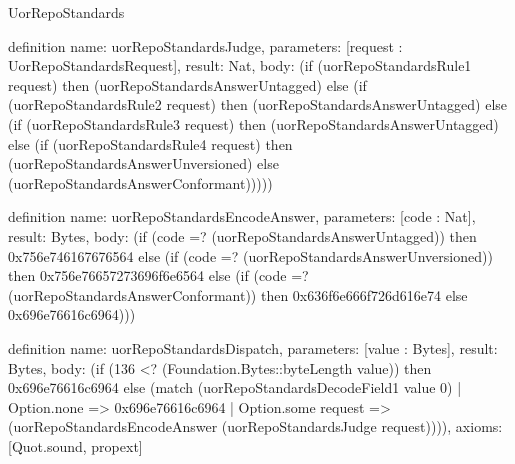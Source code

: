 \begin{lexlean}{UorRepoStandards}
\begin{semanticmodule}
definition{
  name: uorRepoStandardsJudge,
  parameters: [request : UorRepoStandardsRequest],
  result: Nat,
  body: (if (uorRepoStandardsRule1 request) then (uorRepoStandardsAnswerUntagged) else (if (uorRepoStandardsRule2 request) then (uorRepoStandardsAnswerUntagged) else (if (uorRepoStandardsRule3 request) then (uorRepoStandardsAnswerUntagged) else (if (uorRepoStandardsRule4 request) then (uorRepoStandardsAnswerUnversioned) else (uorRepoStandardsAnswerConformant)))))
}

definition{
  name: uorRepoStandardsEncodeAnswer,
  parameters: [code : Nat],
  result: Bytes,
  body: (if (code =? (uorRepoStandardsAnswerUntagged)) then 0x756e746167676564 else (if (code =? (uorRepoStandardsAnswerUnversioned)) then 0x756e76657273696f6e6564 else (if (code =? (uorRepoStandardsAnswerConformant)) then 0x636f6e666f726d616e74 else 0x696e76616c6964)))
}

definition{
  name: uorRepoStandardsDispatch,
  parameters: [value : Bytes],
  result: Bytes,
  body: (if (136 <? (Foundation.Bytes::byteLength value)) then 0x696e76616c6964 else (match (uorRepoStandardsDecodeField1 value 0)
    | Option.none => 0x696e76616c6964
    | Option.some request => (uorRepoStandardsEncodeAnswer (uorRepoStandardsJudge request)))),
  axioms: [Quot.sound, propext]
}
\end{semanticmodule}
\end{lexlean}
